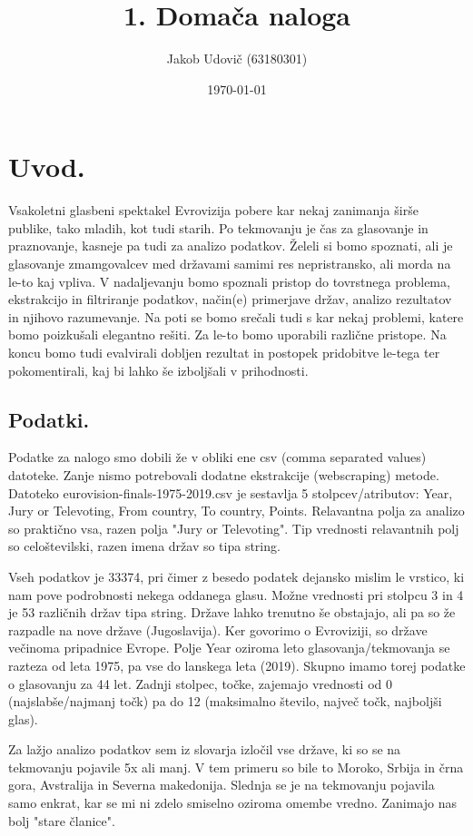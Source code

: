 \documentclass[a4paper,11pt]{article}
\title{1. Domača naloga}
\author{Jakob Udovič (63180301)}
\date{\today}
\begin{document}
\maketitle

\section{Uvod.}
Vsakoletni glasbeni spektakel Evrovizija pobere kar nekaj zanimanja širše publike, tako mladih, kot tudi starih. Po
tekmovanju je čas za glasovanje in praznovanje, kasneje pa tudi za analizo podatkov.
Želeli si bomo spoznati, ali je glasovanje zmamgovalcev med državami samimi res nepristransko, ali morda na le-to kaj vpliva.
V nadaljevanju bomo spoznali pristop do tovrstnega problema, ekstrakcijo in filtriranje podatkov, način(e) primerjave
držav, analizo rezultatov in njihovo razumevanje.
Na poti se bomo srečali tudi s kar nekaj problemi, katere bomo poizkušali elegantno rešiti. Za le-to bomo uporabili različne
pristope. Na koncu bomo tudi evalvirali dobljen rezultat in postopek pridobitve le-tega ter pokomentirali, kaj bi lahko še
izboljšali v prihodnosti.

\subsection{Podatki.}
Podatke za nalogo smo dobili že v obliki ene csv (comma separated values) datoteke. Zanje nismo potrebovali dodatne ekstrakcije
(webscraping) metode.
Datoteko eurovision-finals-1975-2019.csv je sestavlja 5 stolpcev/atributov:
Year, Jury or Televoting, From country, To country, Points.
Relavantna polja za analizo so praktično vsa, razen polja "Jury or Televoting".
Tip vrednosti relavantnih polj so celoštevilski, razen imena držav so tipa string.

Vseh podatkov je 33374, pri čimer z besedo podatek dejansko mislim le vrstico, ki nam pove podrobnosti nekega oddanega glasu.
Možne vrednosti pri stolpcu 3 in 4 je 53 različnih držav tipa string. Države lahko trenutno še obstajajo, ali pa so že
razpadle na nove države (Jugoslavija). Ker govorimo o Evroviziji, so države večinoma pripadnice Evrope.
Polje Year oziroma leto glasovanja/tekmovanja se razteza od leta 1975, pa vse do lanskega leta (2019). Skupno imamo torej
podatke o glasovanju za 44 let.
Zadnji stolpec, točke, zajemajo vrednosti od 0 (najslabše/najmanj točk) pa do 12 (maksimalno število, največ točk, najboljši glas).

Za lažjo analizo podatkov sem iz slovarja izločil vse države, ki so se na tekmovanju pojavile 5x ali manj. V tem primeru so bile
to Moroko, Srbija in črna gora, Avstralija in Severna makedonija. Slednja se je na tekmovanju pojavila samo enkrat, kar se
mi ni zdelo smiselno oziroma omembe vredno. Zanimajo nas bolj "stare članice".
\end{document}
